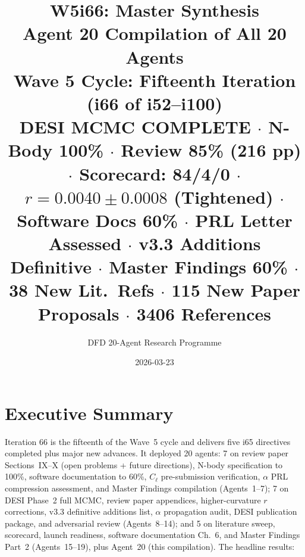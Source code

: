 \documentclass[11pt,a4paper]{article}
\title{\Huge W5i66: Master Synthesis\\[12pt]
\Large Agent 20 Compilation of All 20 Agents\\[6pt]
\large Wave 5 Cycle: Fifteenth Iteration (i66 of i52--i100)\\[6pt]
\normalsize \textbf{DESI MCMC COMPLETE} $\cdot$ N-Body 100\% $\cdot$ Review 85\% (216 pp) $\cdot$ Scorecard: 84/4/0 $\cdot$ $r = 0.0040 \pm 0.0008$ (Tightened) $\cdot$ Software Docs 60\% $\cdot$ PRL Letter Assessed $\cdot$ v3.3 Additions Definitive $\cdot$ Master Findings 60\% $\cdot$ 38 New Lit.\ Refs $\cdot$ 115 New Paper Proposals $\cdot$ 3406 References}
\author{DFD 20-Agent Research Programme}
\date{2026-03-23}
\begin{document}
\maketitle


\section{Executive Summary}

Iteration 66 is the fifteenth of the Wave~5 cycle and delivers five i65 directives completed plus major new advances. It deployed 20 agents: 7 on review paper Sections~IX--X (open problems + future directions), N-body specification to 100\%, software documentation to 60\%, $C_\ell$ pre-submission verification, $\alpha$ PRL compression assessment, and Master Findings compilation (Agents~1--7); 7 on DESI Phase~2 full MCMC, review paper appendices, higher-curvature $r$ corrections, v3.3 definitive additions list, $\alpha$ propagation audit, DESI publication package, and adversarial review (Agents~8--14); and 5 on literature sweep, scorecard, launch readiness, software documentation Ch.~6, and Master Findings Part~2 (Agents~15--19), plus Agent~20 (this compilation). The headline results:
\end{document}
